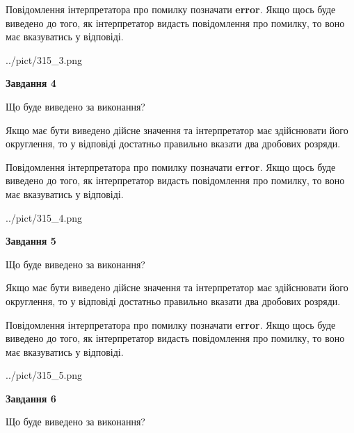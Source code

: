 \documentclass[12pt, ukrainian]{article}
\begin{document}
{\begin {Large}
Повідомлення інтерпретатора про помилку позначати \textbf{error}.
Якщо щось буде виведено до того, як інтерпретатор видасть повідомлення про помилку, 
то воно має вказуватись у відповіді. \par

\begin{center}
	{../pict/315_3.png}
\end{center}
\newpage

{\begin {center}\textbf{Завдання 4}\end {center}}\par
Що буде виведено за виконання? \par

Якщо має бути виведено дійсне значення та інтерпретатор має здійснювати його округлення, 
то у відповіді достатньо правильно вказати два дробових розряди.

Повідомлення інтерпретатора про помилку позначати \textbf{error}.
Якщо щось буде виведено до того, як інтерпретатор видасть повідомлення про помилку, 
то воно має вказуватись у відповіді. \par

\begin{center}
	{../pict/315_4.png}
\end{center}
\newpage

{\begin {center}\textbf{Завдання 5}\end {center}}\par
Що буде виведено за виконання? \par

Якщо має бути виведено дійсне значення та інтерпретатор має здійснювати його округлення, 
то у відповіді достатньо правильно вказати два дробових розряди.

Повідомлення інтерпретатора про помилку позначати \textbf{error}.
Якщо щось буде виведено до того, як інтерпретатор видасть повідомлення про помилку, 
то воно має вказуватись у відповіді. \par

\begin{center}
	{../pict/315_5.png}
\end{center}
\newpage

{\begin {center}\textbf{Завдання 6}\end {center}}\par
Що буде виведено за виконання? \par


\end{Large}}
\end{document}
